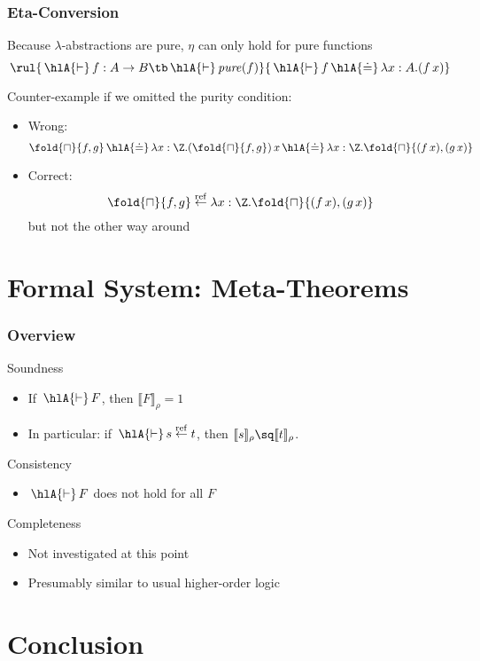 \documentclass{beamer}
\def\choice#1{\fold{\sqcap}{#1}}
\def\pure#1{\mathit{pure}(#1)}
\def\refine#1#2{#1\stackrel{\mathrm{ref}}{\leftarrow}#2}
\def\refine#1#2{#1\stackrel{\mathrm{ref}}{\leftarrow}#2}
\def\der{\,\hlA{\vdash}\,}
\def\syneq{\,\hlA{\doteq}\,}
\def\seme#1#2{\llbracket#1\rrbracket_{#2}}
\def\semr#1{\seme{#1}{\rho}}
\begin{document}
\begin{frame}\frametitle{Eta-Conversion}
Because $\lambda$-abstractions are pure, $\eta$ can only hold for pure functions
\[\rul{\der f:A\to B \tb \der\pure{f}}{\der f \syneq \lambda x:A.(f\,x)}\]

Counter-example if we omitted the purity condition:
\begin{itemize}
\item Wrong:
\[\choice{f,g} \syneq \lambda x:\Z.(\choice{f,g})\,x\syneq \lambda x:\Z.\choice{(f\,x),(g\,x)}\]
\item Correct: \[\refine{\choice{f,g}}{\lambda x:\Z.\choice{(f\,x),(g\,x)}}\]
but not the other way around
\end{itemize}

%
\end{frame}

\section{Formal System: Meta-Theorems}

\begin{frame}\frametitle{Overview}
Soundness
\begin{itemize}
\item If $\der F$, then $\semr{F}=1$
\item In particular: if $\der\refine{s}{t}$, then $\semr{s}\sq\semr{t}$.
\end{itemize}

Consistency
\begin{itemize}
\item $\der F$ does not hold for all $F$
\end{itemize}

Completeness
\begin{itemize}
\item Not investigated at this point
\item Presumably similar to usual higher-order logic
\end{itemize}
\end{frame}

\section{Conclusion}
\end{document}
